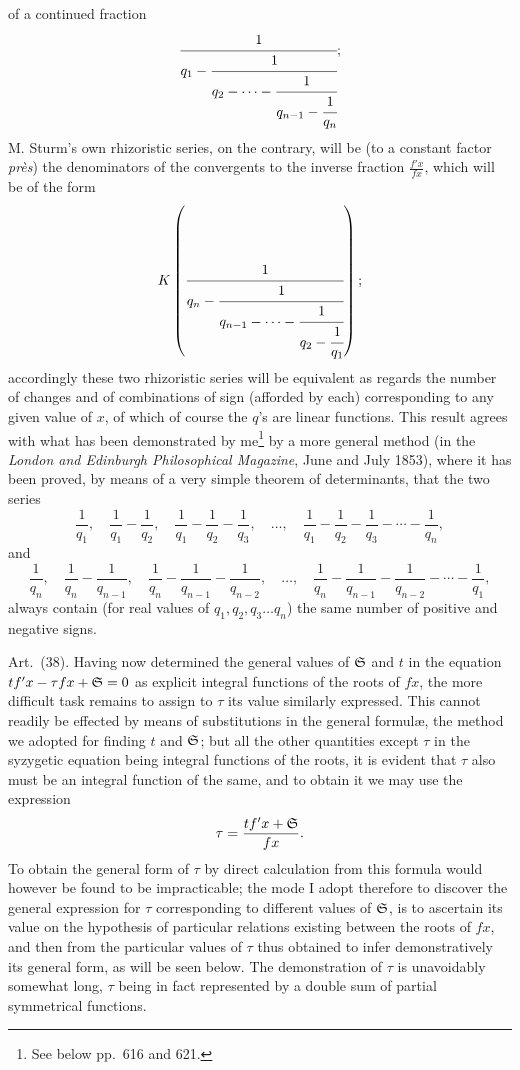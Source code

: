 \documentclass[11pt]{article}
\newcommand{\sourcepage}[1]{\marginpar{\scriptsize p.~#1}}
\newcommand{\art}[1]{\par\smallskip\noindent Art.~(#1).\quad}
\begin{document}
\sourcepage{486}
of a continued fraction
\[
\cfrac1{q_1-\cfrac1{q_2-\cdots-\cfrac1{q_{n-1}-\cfrac1{q_n}}}};
\]
M. Sturm's own rhizoristic series, on the contrary, will be (to a constant factor \emph{près}) the denominators of the convergents to the inverse fraction $\frac{f'x}{fx}$, which will be of the form
\[
K\left(\cfrac1{q_n-\cfrac1{q_{n-1}-\cdots-\cfrac1{q_2-\cfrac1{q_1}}}}\right);
\]
accordingly these two rhizoristic series will be equivalent as regards the number of changes and of combinations of sign (afforded by each) corresponding to any given value of $x$, of which of course the $q$'s are linear functions. This result agrees with what has been demonstrated by me\footnote{See below pp.~616 and 621.} by a more general method (in the \emph{London and Edinburgh Philosophical Magazine}, June and July 1853), where it has been proved, by means of a very simple theorem of determinants, that the two series
\[
\frac1{q_1},\quad \frac1{q_1}-\frac1{q_2},\quad
\frac1{q_1}-\frac1{q_2}-\frac1{q_3},\quad\ldots,\quad
\frac1{q_1}-\frac1{q_2}-\frac1{q_3}-\cdots-\frac1{q_n},
\]
and
\[
\frac1{q_n},\quad \frac1{q_n}-\frac1{q_{n-1}},\quad
\frac1{q_n}-\frac1{q_{n-1}}-\frac1{q_{n-2}},\quad\ldots,\quad
\frac1{q_n}-\frac1{q_{n-1}}-\frac1{q_{n-2}}-\cdots-\frac1{q_1},
\]
always contain (for real values of $q_1,q_2,q_3\ldots q_n$) the same number of positive and negative signs.

\art{38} Having now determined the general values of $\mathfrak{S}$ and $t$ in the equation $tf'x-\tau fx+\mathfrak{S}=0$ as explicit integral functions of the roots of $fx$, the more difficult task remains to assign to $\tau$ its value similarly expressed. This cannot readily be effected by means of substitutions in the general formulæ, the method we adopted for finding $t$ and $\mathfrak{S}$; but all the other quantities except $\tau$ in the syzygetic equation being integral functions of the roots, it is evident that $\tau$ also must be an integral function of the same, and to obtain it we may use the expression
\[
\tau=\frac{tf'x+\mathfrak{S}}{fx}.
\]
To obtain the general form of $\tau$ by direct calculation from this formula would however be found to be impracticable; the mode I adopt therefore to discover the general expression for $\tau$ corresponding to different values of $\mathfrak{S}$, is to ascertain its value on the hypothesis of particular relations existing between the roots of $fx$, and then from the particular values of $\tau$ thus obtained to infer demonstratively its general form, as will be seen below. The demonstration of $\tau$ is unavoidably somewhat long, $\tau$ being in fact represented by a double sum of partial symmetrical functions.
\end{document}
